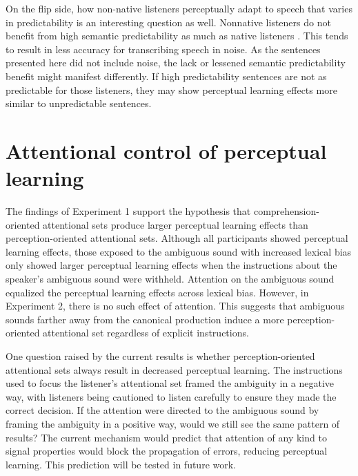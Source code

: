 On the flip side, how non-native listeners perceptually adapt to speech that varies in predictability is an interesting question as well.
Nonnative listeners do not benefit from high semantic predictability as much as native listeners \citep{Mayo1997}.
This tends to result in less accuracy for transcribing speech in noise.
As the sentences presented here did not include noise, the lack or lessened semantic predictability benefit might manifest differently.
If high predictability sentences are not as predictable for those listeners, they may show perceptual learning effects more similar to unpredictable sentences.


\section{Attentional control of perceptual learning}

The findings of Experiment 1 support the hypothesis that comprehension-oriented attentional sets produce larger perceptual learning effects than perception-oriented attentional sets.  
Although all participants showed perceptual learning effects, those exposed to the ambiguous sound with increased lexical bias only showed larger perceptual learning effects when the instructions about the speaker's ambiguous sound were withheld.  
Attention on the ambiguous sound equalized the perceptual learning effects across lexical bias.
However, in Experiment 2, there is no such effect of attention.
This suggests that ambiguous sounds farther away from the canonical production induce a more perception-oriented attentional set regardless of explicit instructions.

One question raised by the current results is whether perception-oriented attentional sets always result in decreased perceptual learning.  
The instructions used to focus the listener's attentional set framed the ambiguity in a negative way, with listeners being cautioned to listen carefully to ensure they made the correct decision.  
If the attention were directed to the ambiguous sound by framing the ambiguity in a positive way, would we still see the same pattern of results?
The current mechanism would predict that attention of any kind to signal properties would block the propagation of errors, reducing perceptual learning.
This prediction will be tested in future work.

